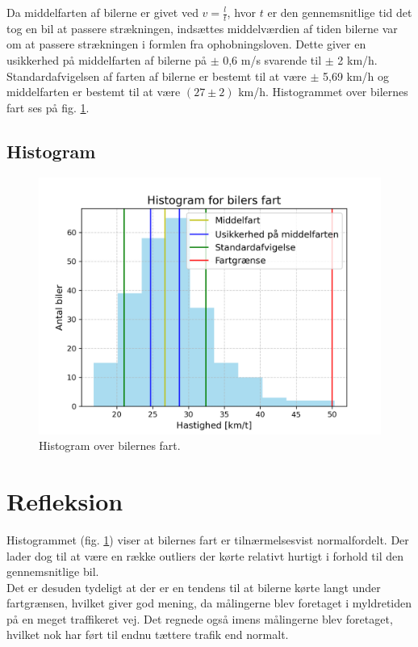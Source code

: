 \documentclass[hidelinks]{article}
\begin{document}
Da middelfarten af bilerne er givet ved $v = \frac{l}{t}$, hvor $t$ er den gennemsnitlige tid det tog en bil at passere strækningen, indsættes middelværdien af tiden bilerne var om at passere strækningen i formlen fra ophobningsloven. Dette giver en usikkerhed på middelfarten af bilerne på $\pm$ 0,6 m/s svarende til $\pm$ 2 km/h.\\

Standardafvigelsen af farten af bilerne er bestemt til at være $\pm$ 5,69 km/h og middelfarten er bestemt til at være $(27 \pm 2)$ km/h. Histogrammet over bilernes fart ses på fig. \ref{fig:histogram}. \\

\subsection{Histogram}

\begin{figure}[H]
    \centering
    \includegraphics[width = 0.75 \textwidth]{img/histogram.png}
    \caption{Histogram over bilernes fart.}
    \label{fig:histogram}
\end{figure}

\section{Refleksion}

Histogrammet (fig. \ref{fig:histogram}) viser at bilernes fart er tilnærmelsesvist normalfordelt. Der lader dog til at være en række outliers der kørte relativt hurtigt i forhold til den gennemsnitlige bil.\\

Det er desuden tydeligt at der er en tendens til at bilerne kørte langt under fartgrænsen, hvilket giver god mening, da målingerne blev foretaget i myldretiden på en meget traffikeret vej. Det regnede også imens målingerne blev foretaget, hvilket nok har ført til endnu tættere trafik end normalt.\\
\end{document}
